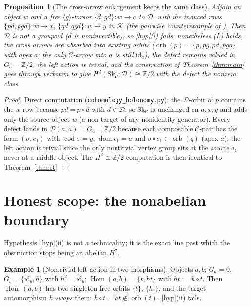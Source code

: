 \documentclass[11pt]{article}
\newtheorem{proposition}[theorem]{Proposition}
\theoremstyle{definition}
\newtheorem{example}[theorem]{Example}
\newcommand{\Hom}{\operatorname{Hom}}
\newcommand{\id}{\mathrm{id}}
\newcommand{\C}{\mathcal{C}}
\newcommand{\D}{\mathcal{D}}
\newcommand{\K}{\mathcal{K}}
\newcommand{\Sk}{\mathrm{Sk}}
\newcommand{\dom}{\operatorname{dom}}
\newcommand{\cod}{\operatorname{cod}}
\newcommand{\orb}{\operatorname{orb}}
\newcommand{\1}{\mathbf{1}}
\begin{document}
\begin{proposition}[The cross-arrow enlargement keeps the same class]\label{prop:p4}
Adjoin an object $w$ and a free $\langle g\rangle$-torsor $\{d,gd\}\colon w\to a$
to $\D$, with the induced rows $\{pd,pgd\}\colon w\to x$, $\{qd,qgd\}\colon w\to y$
in $\K$ (the pairwise counterexample of \cite{pairwise}). Then $\D$ is \emph{not} a
groupoid ($d$ is noninvertible), so \ref{hyp}(i) fails; nonetheless
\textnormal{(L)} holds, the cross arrows are \emph{absorbed} into existing orbits
($\orb(p)=\{p,pg,pd,pgd\}$ with apex $a$; the only $\C$-arrow into $a$ is still
$\id_a$), the defect remains valued in $G_a=\mathbb Z/2$, the left action is
trivial, and the construction of Theorem~\ref{thm:main} goes through verbatim to
give $H^2(\Sk_\C;\D)\cong\mathbb Z/2$ with the defect the nonzero class.
\end{proposition}

\begin{proof}
Direct computation (\texttt{cohomology\_holonomy.py}): the $\D$-orbit of $p$
contains the $w$-row because $pd=p\circ d$ with $d\in\D$, so $\Sk_\C$ is unchanged
on $a,x,y$ and adds only the source object $w$ (a non-target of any nonidentity
generator). Every defect lands in $\D(a,a)=G_a=\mathbb Z/2$ because each composable
$\C$-pair has the form $(\sigma,c_1)$ with $\cod\sigma=y$, $\dom c_1=a$ and
$\sigma\circ c_1\in\orb(q)$ (apex $a$); the left action is trivial since the only
nontrivial vertex group sits at the \emph{source} $a$, never at a middle object.
The $H^2\cong\mathbb Z/2$ computation is then identical to Theorem~\ref{thm:rt}.
\end{proof}

\section{Honest scope: the nonabelian boundary}

Hypothesis~\ref{hyp}(ii) is not a technicality; it is the exact line past which the
obstruction stops being an abelian $H^2$.

\begin{example}[Nontrivial left action in two morphisms]\label{ex:nonab}
Objects $a,b$; $G_a=0$, $G_b=\{\id_b,h\}$ with $h^2=\id_b$; $\Hom(a,b)=\{t,ht\}$
with $ht:=h\circ t$. Then $\Hom(a,b)$ has two singleton free orbits $\{t\}$,
$\{ht\}$, and the target automorphism $h$ \emph{swaps} them: $h\circ t=ht\notin
\orb(t)$. \ref{hyp}(ii) fails.
\end{example}
\end{document}

